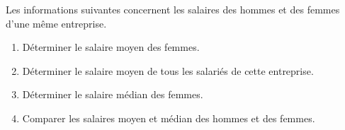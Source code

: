 \begin{exercice*}
    Les informations suivantes concernent les salaires des hommes et des femmes d'une même entreprise.



    \begin{enumerate}
        \item Déterminer le salaire moyen des femmes.
        \item Déterminer le salaire moyen de tous les salariés de cette entreprise.
        \item Déterminer le salaire médian des femmes.
        \item Comparer les salaires moyen et médian des hommes et des femmes.
    \end{enumerate}
\end{exercice*}
